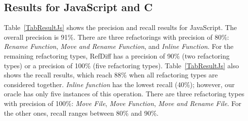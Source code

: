 \subsection{Results for JavaScript and C}
\label{sec:eval:js:c:results}

Table~\ref{TabResultJs} shows the precision and recall results for JavaScript. The overall precision is 91\%. There are three refactorings with precision of 80\%: \textit{Rename Function}, \textit{Move and Rename Function}, and \textit{Inline Function}. For the remaining refactoring types, RefDiff has a precision of 90\% (two refactoring types) or a precision of 100\% (five refactoring types). Table~\ref{TabResultJs} also shows the recall results, which reach 88\% when all refactoring types are considered together.
\textit{Inline function} has the lowest recall (40\%); however, our oracle has only five instances of this operation. There are three refactoring types with precision of 100\%: \textit{Move File}, \textit{Move Function}, \textit{Move and Rename File}. For the other ones, recall ranges between 80\% and 90\%.




